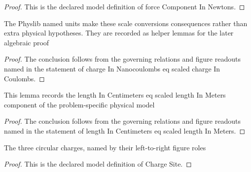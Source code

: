\begin{proof}
  This is the declared model definition of force Component In Newtons.
\end{proof}
\begin{lemma}
  \label{lem:physics:phyx-mini-0900:phyxminiproblems-problemphyxmini0900-chargeinnanocoulombs-eq-scaled-chargeincoulombs}
  The Physlib named units make these scale conversions consequences rather than extra physical hypotheses. They are recorded as helper lemmas for the later algebraic proof
\end{lemma}
\begin{proof}
  The conclusion follows from the governing relations and figure readouts named in the statement of charge In Nanocoulombs eq scaled charge In Coulombs.
\end{proof}
\begin{lemma}
  \label{lem:physics:phyx-mini-0900:phyxminiproblems-problemphyxmini0900-lengthincentimeters-eq-scaled-lengthinmeters}
  This lemma records the length In Centimeters eq scaled length In Meters component of the problem-specific physical model
\end{lemma}
\begin{proof}
  The conclusion follows from the governing relations and figure readouts named in the statement of length In Centimeters eq scaled length In Meters.
\end{proof}
\begin{definition}
  \label{def:physics:phyx-mini-0900:phyxminiproblems-problemphyxmini0900-chargesite}
  The three circular charges, named by their left-to-right figure roles
\end{definition}
\begin{proof}
  This is the declared model definition of Charge Site.
\end{proof}
